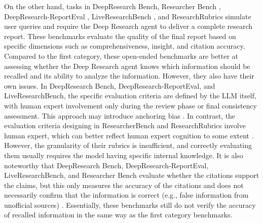 \documentclass[11pt]{article}
\begin{document}
On the other hand, tasks in DeepResearch Bench\citep{du2025deepresearchbenchcomprehensivebenchmark}, Researcher Bench \citep{xu2025researcherbenchevaluatingdeepai}, DeepResearch-ReportEval \citep{fan2025understandingdeepresearchreports}, LiveResearchBench \citep{wangLiveResearchBenchLiveBenchmark2025}, and ResearchRubrics \citep{sharmaResearchRubricsBenchmarkPrompts2025} simulate user queries and require the Deep Research agent to deliver a complete research report. These benchmarks evaluate the quality of the final report based on specific dimensions such as comprehensiveness, insight, and citation accuracy. Compared to the first category, these open-ended benchmarks are better at assessing whether the Deep Research agent knows which information should be recalled and its ability to analyze the information. However, they also have their own issues. In DeepResearch Bench, DeepResearch-ReportEval, and LiveResearchBench, the specific evaluation criteria are defined by the LLM itself, with human expert involvement only during the review phase or final consistency assessment. This approach may introduce anchoring bias \citep{du2025deepresearchbenchcomprehensivebenchmark, fan2025understandingdeepresearchreports, wangLiveResearchBenchLiveBenchmark2025, sharmaResearchRubricsBenchmarkPrompts2025}. In contrast, the evaluation criteria designing in ResearcherBench and ResearchRubrics involve human expert, which can better reflect human expert cognition to some extent \citep{xu2025researcherbenchevaluatingdeepai, sharmaResearchRubricsBenchmarkPrompts2025}. However, the granularity of their rubrics is insufficient, and correctly evaluating them usually requires the model having specific internal knowledge. It is also noteworthy that DeepResearch Bench, DeepResearch-ReportEval, LiveResearchBench, and Researcher Bench evaluate whether the citations support the claims, but this only measures the accuracy of the citations and does not necessarily confirm that the information is correct (e.g., false information from unofficial sources) \citep{du2025deepresearchbenchcomprehensivebenchmark, fan2025understandingdeepresearchreports, wangLiveResearchBenchLiveBenchmark2025, xu2025researcherbenchevaluatingdeepai}. Essentially, these benchmarks still do not verify the accuracy of recalled information in the same way as the first category benchmarks. 
\end{document}
